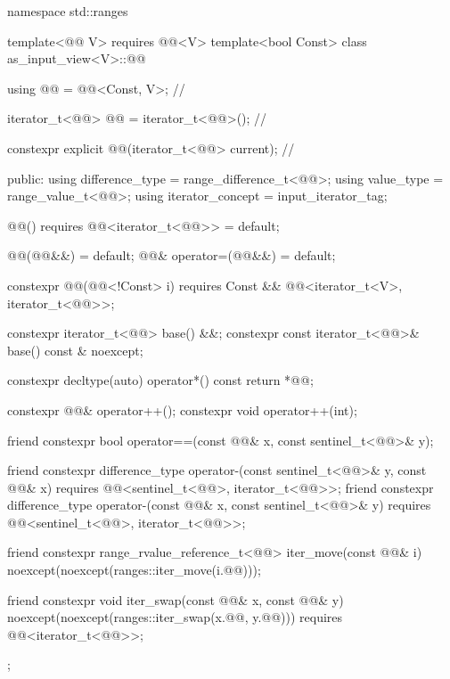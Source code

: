%
\begin{codeblock}
namespace std::ranges {
  template<@@ V>
    requires @@<V>
  template<bool Const>
  class as_input_view<V>::@@ {
    using @@ = @@<Const, V>;                         // \expos

    iterator_t<@@> @@ = iterator_t<@@>();             // \expos

    constexpr explicit @@(iterator_t<@@> current);      // \expos

  public:
    using difference_type = range_difference_t<@@>;
    using value_type = range_value_t<@@>;
    using iterator_concept = input_iterator_tag;

    @@() requires @@<iterator_t<@@>> = default;

    @@(@@&&) = default;
    @@& operator=(@@&&) = default;

    constexpr @@(@@<!Const> i)
      requires Const && @@<iterator_t<V>, iterator_t<@@>>;

    constexpr iterator_t<@@> base() &&;
    constexpr const iterator_t<@@>& base() const & noexcept;

    constexpr decltype(auto) operator*() const { return *@@; }

    constexpr @@& operator++();
    constexpr void operator++(int);

    friend constexpr bool operator==(const @@& x, const sentinel_t<@@>& y);

    friend constexpr difference_type operator-(const sentinel_t<@@>& y, const @@& x)
      requires @@<sentinel_t<@@>, iterator_t<@@>>;
    friend constexpr difference_type operator-(const @@& x, const sentinel_t<@@>& y)
      requires @@<sentinel_t<@@>, iterator_t<@@>>;

    friend constexpr range_rvalue_reference_t<@@> iter_move(const @@& i)
      noexcept(noexcept(ranges::iter_move(i.@@)));

    friend constexpr void iter_swap(const @@& x, const @@& y)
      noexcept(noexcept(ranges::iter_swap(x.@@, y.@@)))
      requires @@<iterator_t<@@>>;
  };
}
\end{codeblock}

